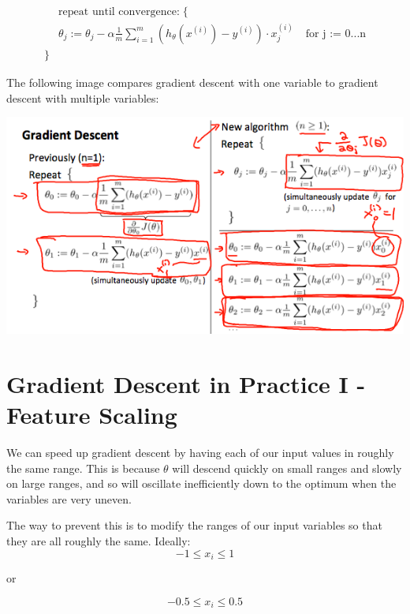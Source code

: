 \documentclass[10pt,a4paper,UTF8]{article}
\begin{document}
\begin{align*}& \text{repeat until convergence:} \; \lbrace \\ \; & \theta_j := \theta_j - \alpha \frac{1}{m} \sum\limits_{i=1}^{m} (h_\theta(x^{(i)}) - y^{(i)}) \cdot x_j^{(i)} \; & \text{for j := 0...n}\\ \rbrace\end{align*}

The following image compares gradient descent with one variable to gradient descent with multiple variables:

\begin{center}
\includegraphics[width=.9\linewidth]{../../img/computer_ng/20171006multivariateLRCostFunction.png}
\end{center}

\section{Gradient Descent in Practice I - Feature Scaling}
\label{sec:orgde029d0}


We can speed up gradient descent by having each of our input values in roughly the same range. This is because \(\theta\) will descend quickly on small ranges and slowly on large ranges, and so will oscillate inefficiently down to the optimum when the variables are very uneven.



The way to prevent this is to modify the ranges of our input variables so that they are all roughly the same. Ideally:
\begin{equation}
\label{eq:2}
-1 \leq x_{i} \leq 1
\end{equation}

or

\begin{equation}
\label{eq:3}
-0.5 \leq x_{i} \leq 0.5
\end{equation}
\end{document}
